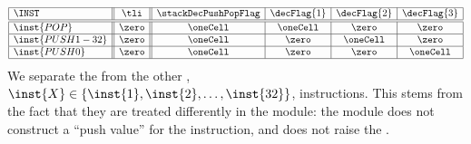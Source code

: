 \[
	\begin{array}{|l||c||c|c|c|c|}
		\hline
		\INST           & \tli  & \stackDecPushPopFlag & \decFlag{1} & \decFlag{2} & \decFlag{3} \\ \hline\hline
		\inst{POP}      & \zero & \oneCell             & \oneCell    & \zero       & \zero       \\ \hline
		\inst{PUSH1-32} & \zero & \oneCell             & \zero       & \oneCell    & \zero       \\ \hline
		\inst{PUSH0}    & \zero & \oneCell             & \zero       & \zero       & \oneCell    \\ \hline
	\end{array}
\]
\saNote{}
We separate the  from the other , $\inst{X} \in \{ \inst{1}, \inst{2}, \dots, \inst{32} \}$, instructions.
This stems from the fact that they are treated differently in the \romMod{} module:
the \romMod{} module does not construct a ``push value'' for the  instruction, and  does not raise the \pushFlag{}.

